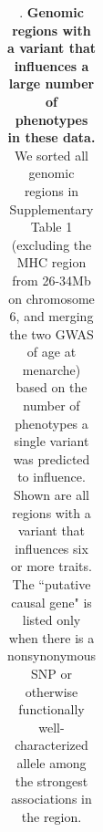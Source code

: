 \documentclass[11pt,titlepage]{article}
\begin{document}
\begin{center}
\begin{table}
{\begin{tabular}{| c| c| c|c| m{5cm}| m{5cm}|}
      \hline
        
    \end{tabular}
    }
      \caption{. \textbf{Genomic regions with a variant that influences a large number of phenotypes in these data.} We sorted all genomic regions in Supplementary Table 1 (excluding the MHC region from 26-34Mb on chromosome 6, and merging the two GWAS of age at menarche) based on the number of phenotypes a single variant was predicted to influence. Shown are all regions with a variant that influences six or more traits. The ``putative causal gene" is listed only when there is a nonsynonymous SNP or otherwise functionally well-characterized allele among the strongest associations in the region.} 
\end{table}
\end{center}




\end{document}
